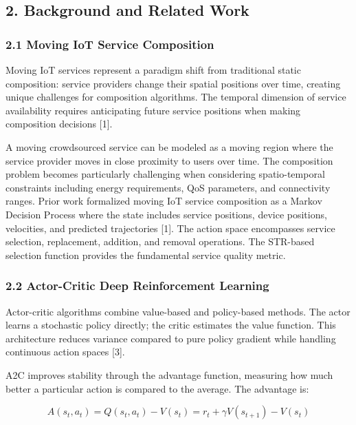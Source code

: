 \subsection{2. Background and Related Work}\label{background-and-related-work}

\hypertarget{moving-iot-service-composition}{%
	\subsubsection{2.1 Moving IoT Service
		Composition}\label{moving-iot-service-composition}}

Moving IoT services represent a paradigm shift from traditional static
composition: service providers change their spatial positions over time,
creating unique challenges for composition algorithms. The temporal
dimension of service availability requires anticipating future service
positions when making composition decisions {[}1{]}.

A moving crowdsourced service can be modeled as a moving region where
the service provider moves in close proximity to users over time. The
composition problem becomes particularly challenging when considering
spatio-temporal constraints including energy requirements, QoS
parameters, and connectivity ranges. Prior work formalized moving IoT
service composition as a Markov Decision Process where the state
includes service positions, device positions, velocities, and predicted
trajectories {[}1{]}. The action space encompasses service selection,
replacement, addition, and removal operations. The STR-based selection
function provides the fundamental service quality metric.

\hypertarget{actor-critic-deep-reinforcement-learning}{%
	\subsubsection{2.2 Actor-Critic Deep Reinforcement
		Learning}\label{actor-critic-deep-reinforcement-learning}}

Actor-critic algorithms combine value-based and policy-based methods.
The actor learns a stochastic policy directly; the critic estimates the
value function. This architecture reduces variance compared to pure
policy gradient while handling continuous action spaces {[}3{]}.

A2C improves stability through the advantage function, measuring how
much better a particular action is compared to the average. The
advantage is:

\[A(s_t, a_t) = Q(s_t, a_t) - V(s_t) = r_t + \gamma V(s_{t+1}) - V(s_t)\]


